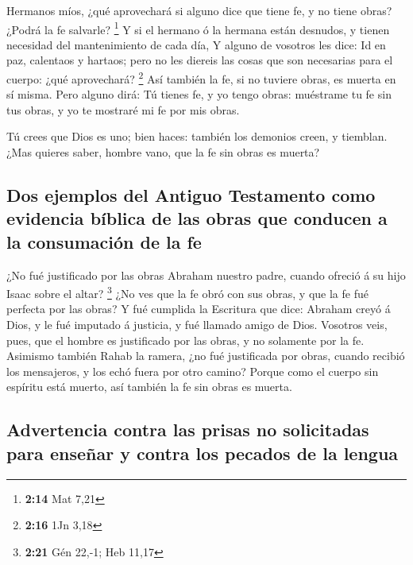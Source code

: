  Hermanos míos, ¿qué aprovechará si alguno dice que tiene
fe, y no tiene obras? ¿Podrá la fe salvarle? \footnote{\textbf{2:14} Mat
  7,21}  Y si el hermano ó la hermana están desnudos, y
tienen necesidad del mantenimiento de cada día,  Y alguno
de vosotros les dice: Id en paz, calentaos y hartaos; pero no les
diereis las cosas que son necesarias para el cuerpo: ¿qué aprovechará?
\footnote{\textbf{2:16} 1Jn 3,18}  Así también la fe, si no
tuviere obras, es muerta en sí misma.  Pero alguno dirá: Tú
tienes fe, y yo tengo obras: muéstrame tu fe sin tus obras, y yo te
mostraré mi fe por mis obras.

 Tú crees que Dios es uno; bien haces: también los demonios
creen, y tiemblan.  ¿Mas quieres saber, hombre vano, que la
fe sin obras es muerta?

\hypertarget{dos-ejemplos-del-antiguo-testamento-como-evidencia-buxedblica-de-las-obras-que-conducen-a-la-consumaciuxf3n-de-la-fe}{%
\subsection{Dos ejemplos del Antiguo Testamento como evidencia bíblica
de las obras que conducen a la consumación de la
fe}\label{dos-ejemplos-del-antiguo-testamento-como-evidencia-buxedblica-de-las-obras-que-conducen-a-la-consumaciuxf3n-de-la-fe}}

 ¿No fué justificado por las obras Abraham nuestro padre,
cuando ofreció á su hijo Isaac sobre el altar? \footnote{\textbf{2:21}
  Gén 22,-1; Heb 11,17}  ¿No ves que la fe obró con sus
obras, y que la fe fué perfecta por las obras?  Y fué
cumplida la Escritura que dice: Abraham creyó á Dios, y le fué imputado
á justicia, y fué llamado amigo de Dios.  Vosotros veis,
pues, que el hombre es justificado por las obras, y no solamente por la
fe.  Asimismo también Rahab la ramera, ¿no fué justificada
por obras, cuando recibió los mensajeros, y los echó fuera por otro
camino?  Porque como el cuerpo sin espíritu está muerto,
así también la fe sin obras es muerta.

\hypertarget{advertencia-contra-las-prisas-no-solicitadas-para-enseuxf1ar-y-contra-los-pecados-de-la-lengua}{%
\subsection{Advertencia contra las prisas no solicitadas para enseñar y
contra los pecados de la
lengua}\label{advertencia-contra-las-prisas-no-solicitadas-para-enseuxf1ar-y-contra-los-pecados-de-la-lengua}}

